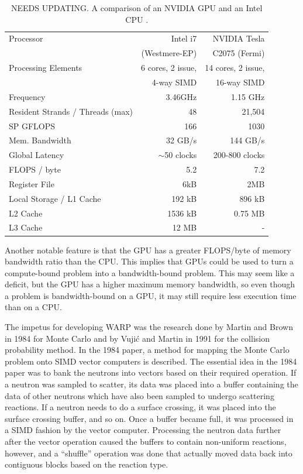 \documentclass[preprint,12pt]{elsarticle}
\begin{document}
\begin{table}[h]
\centering
\caption[A comparison of an NVIDIA GPU and an Intel CPU]{NEEDS UPDATING.  A comparison of an NVIDIA GPU and an Intel CPU \cite{cent, cpu_latency, opteronperformance}.}
\label{gpu_cpu_comp}
\begin{tabular}{| l | r | r |}
\hline
Processor & Intel i7 & NVIDIA Tesla  \\
 &  (Westmere-EP) & C2075 (Fermi) \\
\hline
\hline
Processing Elements & 6 cores, 2 issue, & 14 cores, 2 issue, \\
& 4-way SIMD &  16-way SIMD  \\
\hline
Frequency & 3.46GHz &  1.15 GHz \\
\hline
Resident Strands / Threads (max) & 48 & 21,504 \\
\hline
SP GFLOPS & 166 & 1030 \\
\hline
Mem. Bandwidth &  32 GB/s & 144 GB/s \\
\hline
Global Latency & $\sim$50 clocks & 200-800 clocks  \\
\hline
FLOPS / byte & 5.2  & 7.2 \\
\hline
Register File & 6kB & 2MB \\
\hline
Local Storage / L1 Cache & 192 kB & 896 kB \\
\hline
L2 Cache & 1536 kB & 0.75 MB \\
\hline
L3 Cache & 12 MB & - \\
\hline
\end{tabular}
\end{table}

Another notable feature is that the GPU has a greater FLOPS/byte of memory bandwidth ratio than the CPU.  This implies that GPUs could be used to turn a compute-bound problem into a bandwidth-bound problem.  This may seem like a deficit, but the GPU has a higher maximum memory bandwidth, so even though a problem is bandwidth-bound on a GPU, it may still require less execution time than on a CPU.

The impetus for developing WARP was the research done by Martin and Brown in 1984 \cite{vector} for Monte Carlo and by Vuji\'{c} and Martin in 1991 \cite{vujic_vector} for the collision probability method.  In the 1984 paper, a method for mapping the Monte Carlo problem onto SIMD vector computers is described.  The essential idea in the 1984 paper was to bank the neutrons into vectors based on their required operation.  If a neutron was sampled to scatter, its data was placed into a buffer containing the data of other neutrons which have also been sampled to undergo scattering reactions.  If a neutron needs to do a surface crossing, it was placed into the surface crossing buffer, and so on.  Once a buffer became full, it was processed in a SIMD fashion by the vector computer.  Processing the neutron data further after the vector operation caused the buffers to contain non-uniform reactions, however, and a ``shuffle'' operation was done that actually moved data back into contiguous blocks based on the reaction type.  
\end{document}
